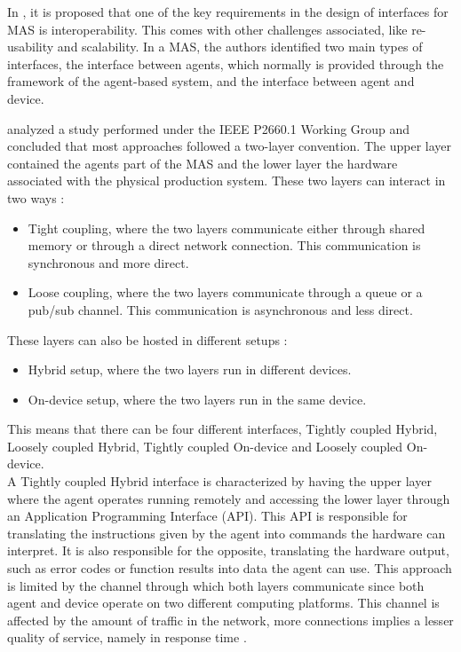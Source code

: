 In \cite{Karnouskos2019}, it is proposed that one of the key requirements in the design of interfaces for MAS is interoperability. This comes with other challenges associated, like re-usability and scalability. In a MAS, the authors identified two main types of interfaces, the interface between agents, which normally is provided through the framework of the agent-based system, and the interface between agent and device. 


\citeauthor{8591641} \cite{8591641} analyzed a study performed under the IEEE P2660.1 Working Group \cite{9340089} and concluded that most approaches followed a two-layer convention. The upper layer contained the agents part of the MAS and the lower layer the hardware associated with the physical production system. These two layers can interact in two ways \cite{8591641}:
\begin{itemize}
	\item Tight coupling, where the two layers communicate either through shared memory or through a direct network connection. This communication is synchronous and more direct.
	\item Loose coupling, where the two layers communicate through a queue or a pub/sub channel. This communication is asynchronous and less direct.
\end{itemize}

These layers can also be hosted in different setups \cite{8591641}:
\begin{itemize}
	\item Hybrid setup, where the two layers run in different devices.
	\item On-device setup, where the two layers run in the same device. 
\end{itemize}

This means that there can be four different interfaces, Tightly coupled Hybrid, Loosely coupled Hybrid, Tightly coupled On-device and Loosely coupled On-device.\\

A Tightly coupled Hybrid interface is characterized by having the upper layer where the agent operates running remotely and accessing the lower layer through an Application Programming Interface (API). This API is responsible for translating the instructions given by the agent into commands the hardware can interpret. It is also responsible for the opposite, translating the hardware output, such as error codes or function results into data the agent can use. This approach is limited by the channel through which both layers communicate since both agent and device operate on two different computing platforms. This channel is affected by the amount of traffic in the network, more connections implies a lesser quality of service, namely in response time \cite{8591641}.\\

